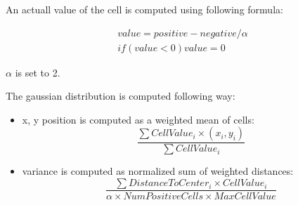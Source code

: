 An actuall value of the cell is computed using following formula:

\begin{equation}        
\begin{split}
value = positive - negative / \alpha  \\
if (value < 0) value = 0 
\end{split}
\end{equation}  

$\alpha$ is set to 2.

The gaussian distribution is computed following way:

\begin{itemize}
\item x, y position is computed as a weighted mean of cells: 
\begin{equation}
  \frac{\sum{CellValue_i\times (x_i,y_i)}}{\sum{CellValue_i}}
\end{equation}
\item variance is computed as normalized sum of weighted distances:
\begin{equation}
\frac{\sum{DistanceToCenter_i\times CellValue_i}}{\alpha\times NumPositiveCells\times MaxCellValue}
\end{equation}
\end{itemize}








                                    